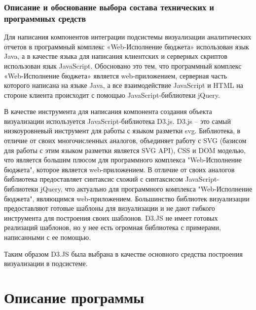 \documentclass[a4paper]{extarticle}
\begin{document}
\subsubsection{Описание и обоснование выбора состава технических и программных средств}
Для написания компонентов интеграции подсистемы визуализации аналитических отчетов в программный комплекс «Web-Исполнение бюджета» использован язык Java, а в качестве языка для написания клиентских и серверных скриптов использован язык JavaScript. Обосновано это тем, что программный комплекс «Web-Исполнение бюджета» является web-приложением, серверная часть которого написана на языке Java, а все взаимодействие JavaScript и HTML на стороне клиента происходит с помощью JavaScript-библиотеки jQuery.\par
В качестве инструмента для написания компонента создания объекта визуализации используется JavaScript-библиотека D3.js. D3.js – это самый низкоуровневый инструмент для работы с языком разметки svg. Библиотека, в отличие от своих многочисленных аналогов, объединяет работу с SVG (базисом для работы с этим языком разметки является SVG API), CSS и DOM моделью, что является большим плюсом для программного комплекса "Web-Исполнение бюджета", которое является web-приложением. В отличие от своих аналогов библиотека предоставляет синтаксис схожий с синтаксисом JavaScript-библиотеки jQuery, что актуально для программного комплекса "Web-Исполнение бюджета", являющимся web-приложением. Большинство библиотек визуализации предоставляют готовые шаблоны для визуализации и не дают гибкого инструмента для построения своих шаблонов. D3.JS не имеет готовых реализаций шаблонов, но у нее есть огромная библиотека с примерами, написанными с ее помощью.\par
Таким образом D3.JS была выбрана в качестве основного средства построения визуализации в подсистеме.

\section{Описание программы}
\end{document}
